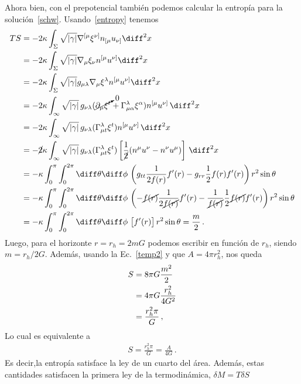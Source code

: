 \documentclass[../Main.tex]{subfiles}
\begin{document}
Ahora bien, con el prepotencial también podemos calcular la entropía para la solución~\eqref{schw}. Usando~\eqref{entropy} tenemos
\begin{align}\notag
TS&=-2\kappa\int_{\Sigma}\sqrt{|\gamma|}\nabla^{[\mu}\xi^{\nu]}n_{[\mu}u_{\nu]}\diff^{2}x\\ \notag
&=-2\kappa\int_{\Sigma}\sqrt{|\gamma|}\nabla_{\mu}\xi_{\nu}n^{[\mu}u^{\nu]}\diff^{2}x\\ \notag
&=-2\kappa\int_{\Sigma}\sqrt{|\gamma|}g_{\mu\lambda}\nabla_{\mu}\xi^{\lambda}n^{[\mu}u^{\nu]}\diff^{2}x\\ \notag
&=-2\kappa\int_{\infty}\sqrt{|\gamma|}\,g_{\nu\lambda}(\cancelto{0}{\partial_{\mu}\xi^{t}}+\Gamma^{\lambda}_{\mu\alpha}\xi^{\alpha})n^{[\mu}u^{\nu]}\,\diff^{2}x\\ \notag
&=-2\kappa\int_{\infty}\sqrt{|\gamma|}\,g_{\nu\lambda}(\Gamma^{\lambda}_{\mu t}\xi^{t})n^{[\mu}u^{\nu]}\,\diff^{2}x\\ \notag
&=-\cancel{2}\kappa\int_{\infty}\sqrt{|\gamma|}\,g_{\nu\lambda}(\Gamma^{\lambda}_{\mu t}\xi^{t})\left[\frac{1}{\cancel{2}}(n^{\mu}u^{\nu}-n^{\nu}u^{\mu})\right]\,\diff^{2}x \\ \notag
&=-\kappa\int_{0}^{\pi}\int_{0}^{2\pi}\diff\theta \diff\phi\,\left(g_{tt}\frac{1}{2f(r)}f'(r)-g_{rr}\frac{1}{2}f(r)f'(r)\right)r^{2}\sin{\theta}\\ \notag
&=-\kappa\int_{0}^{\pi}\int_{0}^{2\pi}\diff\theta \diff\phi\,\left(-\cancel{f(r)}\frac{1}{2\cancel{f(r)}}f'(r)-\frac{1}{\cancel{f(r)}}\frac{1}{2}\cancel{f(r)}f'(r)\right)r^{2}\sin{\theta} \\ 
&=-\kappa\int_{0}^{\pi}\int_{0}^{2\pi}\diff\theta \diff\phi\,\left[f'(r)\right]r^{2}\sin{\theta}=\frac{m}{2}  \, .
\end{align}
Luego, para el horizonte $r=r_{h}=2mG$ podemos escribir en función de $r_{h}$, siendo $m=r_{h}/2G$. Además, usando la Ec.~\eqref{temp2} y que $A=4\pi r^{2}_{h}$, nos queda 
\begin{align} \notag
S&=8\pi G \frac{m^{2}}{2}\\ \notag
    &=4\pi G \frac{r^{2}_{h}}{4G^2}\\
    &=\frac{r^{2}_{h}\pi}{G}\, ,
\end{align}
Lo cual es equivalente a 
\begin{align}
    S=\frac{r^{2}_{h}\pi}{G}=\frac{A}{4G}\, .
\end{align}
Es decir,la entropía satisface la ley de un cuarto del área. Además, estas cantidades satisfacen la primera ley de la termodinámica, $\delta M=T\delta S$
\end{document}
